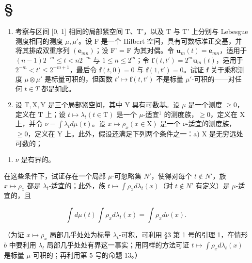 \section*{\texorpdfstring{\S\CurrentExerciseGroup}{第{\CurrentExerciseGroup}节}}
{}

\begin{enumerate}
\def\labelenumi{\arabic{enumi})}
\item
  考察与区间 {[}0, 1{]} 相同的局部紧空间 T、T'，以及 T 与 T' 上分别与 Lebesgue 测度相同的测度 \(\mu, \mu'\)。设 F 是一个 Hilbert 空间，具有可数标准正交基，并将其排成双重序列 \((\mathbf{e}_{mn})\)；设 F' = F 为其对偶。令 \(\mathbf{u}_m(t) = \mathbf{e}_{mn}\)，适用于 \((n-1)2^{-m} \leqslant t < n2^{-m}\) 与 \(1 \leqslant n \leqslant 2^m\)；令 \(\mathbf{f}(t, t') = 2^m \mathbf{u}_m(t)\)，适用于 \(2^{-m} < t' \leqslant 2^{-m+1}\)，最后令 \(\mathbf{f}(t, 0) = 0\) 与 \(\mathbf{f}(1, t') = 0\)。试证 \(\mathbf{f}\) 关于乘积测度 \(\mu \otimes \mu'\) 是标量可积的，但函数 \(t' \mapsto \mathbf{f}(t, t')\) 不是标量 \(\mu'\)-可积的——对任何 \(t \in T\) 都是如此。
\item
  设 \(\mathrm{T}, \mathrm{X}, \mathrm{Y}\) 是三个局部紧空间，其中 \(\mathrm{Y}\) 具有可数基。设 \(\mu\) 是一个测度 \(\geqslant 0\)，定义在 \(\mathrm{T}\) 上；设 \(t \mapsto \lambda_t (t \in \mathrm{T})\) 是一个 \(\mu\)-适宜\(^1\) 的测度族，\(\geqslant 0\)，定义在 \(\mathrm{X}\) 上，并令 \(\nu = \int \lambda_t d\mu(t)\)。设 \(x \mapsto \rho_x (x \in \mathrm{X})\) 是一个 \(\nu\)-适宜的测度族，\(\geqslant 0\)，定义在 \(\mathrm{Y}\) 上。此外，假设还满足下列两个条件之一：a) \(\mathrm{X}\) 是无穷远处可数的；
\end{enumerate}

\begin{enumerate}
\def\labelenumi{\alph{enumi})}
\setcounter{enumi}{1}
\tightlist
\item
  \(\nu\) 是有界的。
\end{enumerate}

在这些条件下，试证存在一个局部 \(\mu\)-可忽略集 \(N'\)，使得对每个 \(t \notin N'\)，族 \(x \mapsto \rho_x\) 都是 \(\lambda_t\)-适宜的；此外，族 \(t \mapsto \int \rho_x d\lambda_t(x)\)（对 \(t \notin N'\) 有定义）是 \(\mu\)-适宜的，且

\[
\int d \mu (t) \int \rho_ {x} d \lambda_ {t} (x) = \int \rho_ {x} d \nu (x).
\]

（为证 \(x \mapsto \rho_x\) 局部几乎处处为标量 \(\lambda_t\)-可积，可利用 §3 第 1 号的引理 1，在情形 \(b\) 中要利用 \(\lambda_t\) 局部几乎处处有界这一事实；用同样的方法可证 \(t \mapsto \int \rho_x d\lambda_t(x)\) 是标量 \(\mu\)-可积的；再利用第 5 号的命题 13。）

